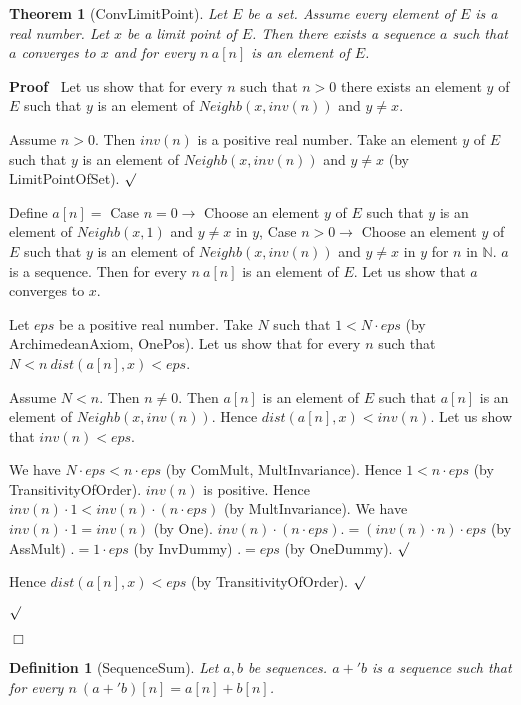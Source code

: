 \documentclass{article}
\newenvironment{forthel}{\begin{leftbar}}{\end{leftbar}}
\newenvironment{proof}{\noindent\textbf{Proof\ }}{\hspace*{\fill}$\Box$\medskip}
\newenvironment{subproof}{\begin{list}{}{}
		\item[\text{Proof}]}{\hfill $\surd$ \end{list}}
\newtheorem{theorem}{Theorem}
\newtheorem{definition}{Definition}
\newcommand{\NN}{\mathbb{N}}
\begin{document}
\begin{forthel}
	\begin{theorem}[ConvLimitPoint]
	Let $E$ be a set. Assume every element of $E$ is a real number. Let $x$ be a limit point of $E$.
	Then there exists a sequence $a$ such that $a$ converges to $x$ and for every $n \ a[n]$ is an element of $E$.
	\end{theorem}
	\begin{proof}
	Let us show that for every $n$ such that $n > 0$ there exists an element $y$ of $E$ such that
	$y$ is an element of $Neighb(x,inv(n))$ and $y \neq x$.
	\begin{subproof}
	Assume $n > 0$.
	Then $inv(n)$ is a positive real number.
	Take an element $y$ of $E$ such that $y$ is an element of $Neighb(x,inv(n))$
	and $y \neq x$ (by LimitPointOfSet).
	\end{subproof}
	Define $a[n] =$ Case $n = 0 \rightarrow$ Choose an element $y$ of $E$ such that $y$ is an element of
	$Neighb(x,1)$ and $y \neq x$ in $y$,
	Case $n > 0 \rightarrow$ Choose an element $y$ of $E$ such that $y$ is an element of
	$Neighb(x,inv(n))$ and $y \neq x$ in $y$
	for $n$ in $\NN$.
	$a$ is a sequence.	
	Then for every $n \ a[n]$ is an element of $E$.
	Let us show that $a$ converges to $x$.
	\begin{subproof}
	Let $eps$ be a positive real number.
	Take $N$ such that $1 < N \cdot eps$ (by ArchimedeanAxiom, OnePos).
	Let us show that for every $n$ such that $N < n \ dist(a[n],x) < eps$.
	\begin{subproof}
	Assume $N < n$. Then $n \neq 0$.
	Then $a[n]$ is an element of $E$ such that $a[n]$ is an element of $Neighb(x,inv(n))$.
	Hence $dist(a[n],x) < inv(n)$.
	Let us show that $inv(n) < eps$.
	\begin{subproof}
	We have $N \cdot eps < n \cdot eps$ (by ComMult, MultInvariance).
	Hence $1 < n \cdot eps$ (by TransitivityOfOrder).
	$inv(n)$ is positive.
	Hence $inv(n) \cdot 1 < inv(n) \cdot (n \cdot eps)$ (by MultInvariance).
	We have $inv(n) \cdot 1 = inv(n)$ (by One).
	$inv(n) \cdot (n \cdot eps) .= (inv(n) \cdot n) \cdot eps$ (by AssMult)
	$.= 1 \cdot eps$ (by InvDummy)
	$.= eps$ (by OneDummy).
	\end{subproof}
	Hence $dist(a[n],x) < eps$ (by TransitivityOfOrder).
	\end{subproof}
	\end{subproof}
	\end{proof}
	
	\begin{definition}[SequenceSum]
	Let $a,b$ be sequences. $a +' b$ is a sequence such that for every $n \ (a +' b)[n] = a[n] + b[n]$.
	\end{definition}
	

\end{forthel}
\end{document}

